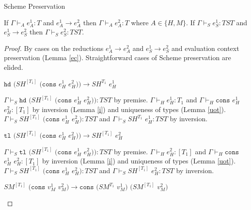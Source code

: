 \begin{theorem}{Scheme Preservation}

\label{thmpns}

If $\Gamma\vdash_{A}e_{A}^{1}:T$ and $e_{A}^{1}\rightarrow e_{A}^{2}$ then $\Gamma\vdash_{A}e_{A}^{2}:T$ where $A\in\lbrace H,M\rbrace$.  If $\Gamma\vdash_{S}e_{S}^{1}:TST$ and $e_{S}^{1}\rightarrow e_{S}^{2}$ then $\Gamma\vdash_{S}e_{S}^{2}:TST$.

\begin{proof}

By cases on the reductions $e_{A}^{1}\rightarrow e_{A}^{2}$ and $e_{S}^{1}\rightarrow e_{S}^{2}$ and evaluation context preservation (Lemma \ref{ec}).  Straightforward cases of Scheme preservation are elided.


\begin{case}
$\mathtt{hd}$ $(SH^{[T_{1}]}$ $(\mathtt{cons}$ $e_{H}^{1}$ $e_{H}^{2}))\rightarrow SH^{T_{1}}$ $e_{H}^{1}$

$\Gamma\vdash_{S}\mathtt{hd}$ $(SH^{[T_{1}]}$ $(\mathtt{cons}$ $e_{H}^{1}$ $e_{H}^{2})):TST$ by premise.  $\Gamma\vdash_{H}e_{H}^{1}:T_{1}$ and $\Gamma\vdash_{H}\mathtt{cons}$ $e_{H}^{1}$ $e_{H}^{2}:[T_{1}]$ by inversion (Lemma \ref{i}) and uniqueness of types (Lemma \ref{uot}).  $\Gamma\vdash_{S}SH^{[T_{1}]}$ $(\mathtt{cons}$ $e_{H}^{1}$ $e_{H}^{2}):TST$ and $\Gamma\vdash_{S}SH^{T_{1}}$ $e_{H}^{1}:TST$ by inversion.
\end{case}


\begin{case}
$\mathtt{tl}$ $(SH^{[T_{1}]}$ $(\mathtt{cons}$ $e_{H}^{1}$ $e_{H}^{2}))\rightarrow SH^{[T_{1}]}$ $e_{H}^{2}$

$\Gamma\vdash_{S}\mathtt{tl}$ $(SH^{[T_{1}]}$ $(\mathtt{cons}$ $e_{H}^{1}$ $e_{H}^{2})):TST$ by premise.  $\Gamma\vdash_{H}e_{H}^{2}:[T_{1}]$ and $\Gamma\vdash_{H}\mathtt{cons}$ $e_{H}^{1}$ $e_{H}^{2}:[T_{1}]$ by inversion (Lemma \ref{i}) and uniqueness of types (Lemma \ref{uot}).  $\Gamma\vdash_{S}SH^{[T_{1}]}$ $(\mathtt{cons}$ $e_{H}^{1}$ $e_{H}^{2}):TST$ and $\Gamma\vdash_{S}SH^{[T_{1}]}$ $e_{H}^{2}:TST$ by inversion.
\end{case}


\begin{case}
$SM^{[T_{1}]}$ $(\mathtt{cons}$ $v_{M}^{1}$ $v_{M}^{2})\rightarrow\mathtt{cons}$ $(SM^{T_{1}}$ $v_{M}^{1})$ $(SM^{[T_{1}]}$ $v_{M}^{2})$


\end{case}
\end{proof}
\end{theorem}
